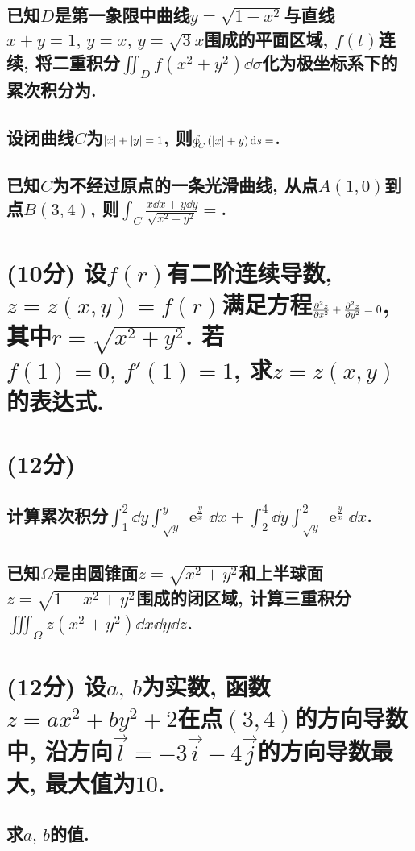 \documentclass[12pt]{ctexart}
\DeclareMathOperator{\ee}{\mathrm{e}}
\begin{document}
\subsection{已知$D$是第一象限中曲线$y=\sqrt{1-x^{2}}$与直线$x+y=1,\,y=x,\,y=\sqrt{3}x$围成的平面区域, $f(t)$连续, 将二重积分$\iint_{D}f(x^{2}+y^{2})\dd{\sigma}$化为极坐标系下的累次积分为\blank.}
\subsection{设闭曲线$C$为$\abs{x}+\abs{y}=1$, 则$\oint_{C}\qty(\abs{x}+y)\dd{s}=$\blank.}
\pagebreak
\subsection{已知$C$为不经过原点的一条光滑曲线, 从点$A(1,0)$到点$B(3,4)$, 则\newline$\int_{C}\frac{x\dd{x}+y\dd{y}}{\sqrt{x^{2}+y^{2}}}=$\blank.}
\section{(10分) 设$f(r)$有二阶连续导数,$z=z(x,y)=f(r)$满足方程$\pdv[2]{z}{x}+\pdv[2]{z}{y}=0$, 其中$r=\sqrt{x^{2}+y^{2}}$. 若$f(1)=0,\,f'(1)=1$, 求$z=z(x,y)$的表达式.}
\section{(12分)}
\subsection{计算累次积分$\int_{1}^{2}\dd{y}\int_{\sqrt{y}}^{y}\ee^{\frac{y}{x}}\dd{x}+\int_{2}^{4}\dd{y}\int_{\sqrt{y}}^{2}\ee^{\frac{y}{x}}\dd{x}$.}
\subsection{已知$\Omega$是由圆锥面$z=\sqrt{x^{2}+y^{2}}$和上半球面$z=\sqrt{1-x^{2}+y^{2}}$围成的闭区域, 计算三重积分$\iiint_{\Omega}z(x^{2}+y^{2})\dd{x}\dd{y}\dd{z}$.}
\section{(12分) 设$a,\,b$为实数, 函数$z=ax^{2}+by^{2}+2$在点$(3,4)$的方向导数中, 沿方向$\overrightarrow{l}=-3\overrightarrow{i}-4\overrightarrow{j}$的方向导数最大, 最大值为$10$.}
\subsection{求$a,\,b$的值.}
\end{document}
